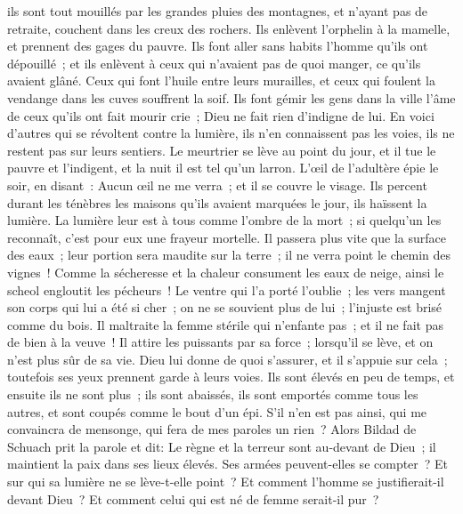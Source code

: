 \begin{multicols}{2}
ils sont tout mouillés par les grandes pluies des montagnes, et n'ayant pas de retraite, couchent dans les creux des rochers. 
Ils enlèvent l'orphelin à la mamelle, et prennent des gages du pauvre. 
Ils font aller sans habits l'homme qu'ils ont dépouillé~; et ils enlèvent à ceux qui n'avaient pas de quoi manger, ce qu'ils avaient glâné.
Ceux qui font l'huile entre leurs murailles, et ceux qui foulent la vendange dans les cuves souffrent la soif.
Ils font gémir les gens dans la ville l'âme de ceux qu'ils ont fait mourir crie~; Dieu ne fait rien d'indigne de lui.
En voici d'autres qui se révoltent contre la lumière, ils n'en connaissent pas les voies, ils ne restent pas sur leurs sentiers.
Le meurtrier se lève au point du jour, et il tue le pauvre et l'indigent, et la nuit il est tel qu'un larron.
L'œil de l'adultère épie le soir, en disant~: Aucun œil ne me verra~; et il se couvre le visage.
Ils percent durant les ténèbres les maisons qu'ils avaient marquées le jour, ils haïssent la lumière.
La lumière leur est à tous comme l'ombre de la mort~; si quelqu'un les reconnaît, c'est pour eux une frayeur mortelle.
Il passera plus vite que la surface des eaux~; leur portion sera maudite sur la terre~; il ne verra point le chemin des vignes~!
Comme la sécheresse et la chaleur consument les eaux de neige, ainsi le scheol engloutit les pécheurs~!
Le ventre qui l'a porté l'oublie~; les vers mangent son corps qui lui a été si cher~; on ne se souvient plus de lui~; l'injuste est brisé comme du bois.
Il maltraite la femme stérile qui n'enfante pas~; et il ne fait pas de bien à la veuve~!
Il attire les puissants par sa force~; lorsqu'il se lève, et on n'est plus sûr de sa vie. 
Dieu lui donne de quoi s'assurer, et il s'appuie sur cela~; toutefois ses yeux prennent garde à leurs voies.
Ils sont élevés en peu de temps, et ensuite ils ne sont plus~; ils sont abaissés, ils sont emportés comme tous les autres, et sont coupés comme le bout d'un épi. 
S'il n'en est pas ainsi, qui me convaincra de mensonge, qui fera de mes paroles un rien~?
\VerseOne{}Alors Bildad de Schuach prit la parole et dit: 
Le règne et la terreur sont au-devant de Dieu~; il maintient la paix dans ses lieux élevés.
 Ses armées peuvent-elles se compter~? Et sur qui sa lumière ne se lève-t-elle point~?
Et comment l'homme se justifierait-il devant Dieu~? Et comment celui qui est né de femme serait-il pur~?

\end{multicols}
